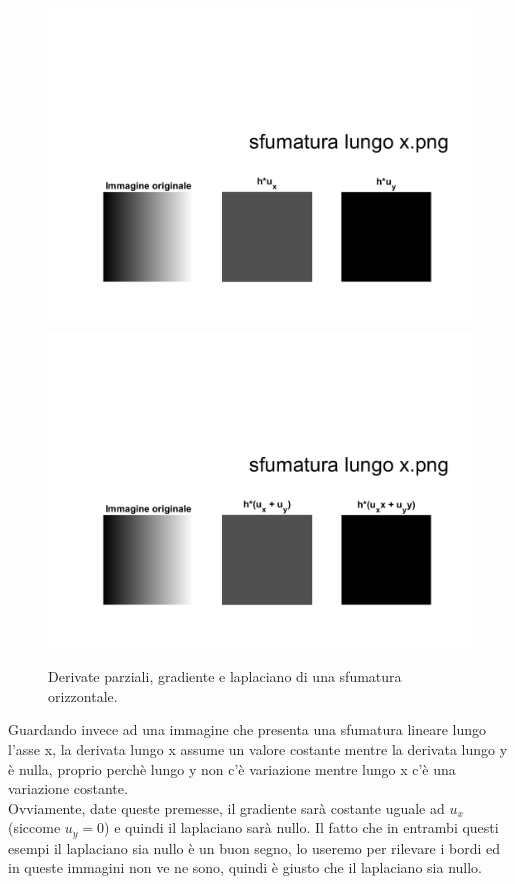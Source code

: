 \newpage
\begin{figure}[htb] 
\centering
\includegraphics[scale=0.4, trim = 0 0 0 10.5cm, clip]{Pictures/Risultati/sfumatura lungo x bianco e nero derivate parziali.png}
\includegraphics[scale=0.4, trim = 0 0 0 10.5cm, clip]{Pictures/Risultati/sfumatura lungo x bianco e nero gradiente e laplaciano.png}
\caption{Derivate parziali, gradiente e laplaciano di una sfumatura orizzontale.}\label{fig:figura}
\end{figure}

Guardando invece ad una immagine che presenta una sfumatura lineare lungo l'asse x, la derivata lungo x assume un valore costante mentre la derivata lungo y è nulla, proprio perchè lungo y non c'è variazione mentre lungo x c'è una variazione costante.\\
Ovviamente, date queste premesse, il gradiente sarà costante uguale ad $u_x$ (siccome $u_y=0$) e quindi il laplaciano sarà nullo.
Il fatto che in entrambi questi esempi il laplaciano sia nullo è un buon segno, lo useremo per rilevare i bordi ed in queste immagini non ve ne sono, quindi è giusto che il laplaciano sia nullo.\\

